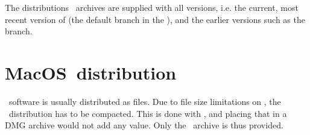 The distributions \zip\ archives are supplied with all versions, i.e. the current, most recent version of \mf (the default branch in the \repo), and the earlier versions such as the  branch.


\section{MacOS\texttrademark\ distribution}

\MacOS\ software is usually distributed as  files. Due to file size limitations on \github, the \MacOS\ distribution has to be compacted. This is done with \zip, and placing that in a DMG archive would not add any value. Only the \zip\ archive is thus provided.


